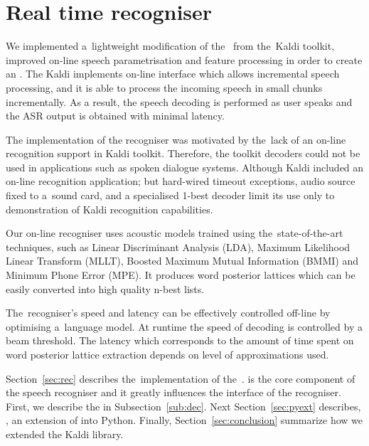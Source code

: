 \chapter{Real time recogniser}
\label{cha:decoder}

We implemented a~lightweight modification of the~ from the~Kaldi toolkit, improved on-line speech parametrisation and feature processing in order to create an .
The Kaldi  implements on-line interface which allows incremental speech processing, and it is able to process the incoming speech in small chunks incrementally.
As a result, the speech decoding is performed as user speaks and the ASR output is obtained with minimal latency.

The implementation of the recogniser was motivated by the~lack of an on-line recognition support in Kaldi toolkit.
Therefore, the toolkit decoders could not be used in applications such as spoken dialogue systems.
Although Kaldi included an on-line recognition application; but hard-wired timeout exceptions, audio source fixed to a~sound card, and a specialised 1-best decoder limit its use only to demonstration of Kaldi recognition capabilities.

Our on-line recogniser uses acoustic models trained using the~state-of-the-art techniques, 
such as Linear Discriminant Analysis (LDA), Maximum Likelihood Linear Transform (MLLT), Boosted Maximum Mutual Information (BMMI) and Minimum Phone Error (MPE).
It produces word posterior lattices which can be easily converted into high quality n-best lists.

The~recogniser's speed and latency can be effectively controlled off-line by optimising a~language model. 
At runtime the speed of decoding is controlled by a beam threshold.
The latency which corresponds to the amount of time spent on word posterior lattice extraction depends on level of approximations used.

Section~\ref{sec:rec} describes the~implementation of the~.
 is the core component of the speech recogniser and it greatly influences the interface of the recogniser.
First, we describe the  in Subsection~\ref{sub:dec}. 
Next Section~\ref{sec:pyext} describes, , an extension of  into Python.
Finally, Section~\ref{sec:conclusion} summarize how we extended the Kaldi library.


